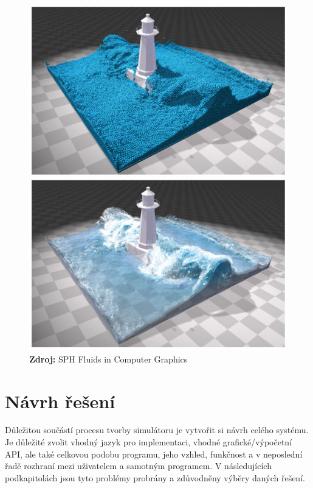 \begin{figure}[h]\centering
	\centering
	\captionsetup{justification=centering}
	\includegraphics[width=0.5\linewidth]{obrazky-figures/SPHSim1_01.jpg}\hfill
	\includegraphics[width=0.5\linewidth]{obrazky-figures/SPHSim1_02.jpg}\hfill
	\textbf{Zdroj: } SPH Fluids in Computer Graphics \cite{Ihmsen14}
	\label{fig:SPHFigure}
\end{figure}

\chapter{Návrh řešení}
\label{chapter:navrh_resení}
Důležitou součástí procesu tvorby simulátoru je vytvořit si návrh celého systému. Je důležité zvolit vhodný jazyk pro implementaci, vhodné grafické/výpočetní API, ale také celkovou podobu programu, jeho vzhled, funkčnost a v neposlední řadě rozhraní mezi uživatelem a samotným programem. V následujících podkapitolách jsou tyto problémy probrány a zdůvodněny výběry daných řešení. 

